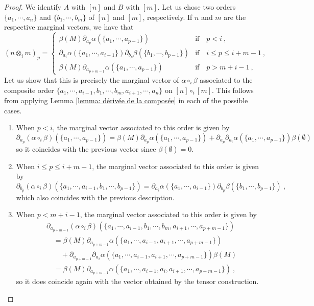 \documentclass[a4paper,12pt]{amsart}
\begin{document}
\begin{proof}
We identify $A$ with $[n]$ and $B$ with $[m]$. Let us chose two orders $\{a_1,\cdots,a_n\}$ and $\{b_1,\cdots,b_m\}$ of $[n]$ and $[m]$, respectively. If $n$ and $m$ are the respective marginal vectors, we have that
\[
(n \otimes_i m)_{p} = 
\begin{cases}
\beta(M)\partial_{a_p}\alpha(\{a_1,\cdots,a_{p-1}\}) & \text{if} \quad p<i~, \\
\partial_{a_i}\alpha(\{a_1,\cdots,a_{i-1}\})\partial_{b_p}\beta(\{b_1,\cdots,b_{p-1}\}) & \text{if} \quad i \leq p \leq i+m-1~, \\
\beta(M)\partial_{a_{p+m-1}}\alpha(\{a_1,\cdots,a_{p-1}\}) & \text{if} \quad p>m+i-1~,
\end{cases}
\]
Let us show that this is precisely the marginal vector of $\alpha \circ_i \beta$ associated to the composite order $\{a_1,\cdots, a_{i-1}, b_1, \cdots, b_m, a_{i+1}, \cdots, a_n\}$ on $[n] \circ_i [m]$. This follows from applying Lemma \ref{lemma: dérivée de la composée} in each of the possible cases.

\begin{enumerate}
    \item When $p<i$, the marginal vector associated to this order is given by 
    \[
    \partial_{a_p}(\alpha \circ_i \beta)(\{a_1,\cdots, a_{p-1}\}) = \beta(M)\partial_{a_p}\alpha(\{a_1,\cdots, a_{p-1}\}) + \partial_{a_p}\partial_{a_i}\alpha(\{a_1,\cdots, a_{p-1}\})\beta(\emptyset) 
    \]
    so it coincides with the previous vector since $\beta(\emptyset) = 0$.

    \medskip
    
    \item When $i \leq p \leq i+m-1$, the marginal vector associated to this order is given by 
    \[
    \partial_{b_p}(\alpha \circ_i \beta)(\{a_1,\cdots, a_{i-1}, b_1, \cdots, b_{p-1}\}) = \partial_{a_i}\alpha(\{a_1,\cdots, a_{i-1}\})\partial_{b_p}\beta(\{b_1, \cdots, b_{p-1}\})~,
    \]
    which also coincides with the previous description. 

    \medskip
    
    \item When $p<m+i-1$, the marginal vector associated to this order is given by 
    \[
    \begin{aligned}
        & \partial_{a_{p+m-1}}(\alpha \circ_i \beta)(\{a_1,\cdots, a_{i-1}, b_1, \cdots, b_{m},a_{i+1}, \cdots, a_{p+m-1}\})  \\ & \quad = \beta(M)\partial_{a_{p+m-1}}\alpha(\{a_1,\cdots, a_{i-1}, a_{i+1}, \cdots, a_{p+m-1}\}) \\ & \qquad + \partial_{a_{p+m-1}}\partial_{a_i}\alpha(\{a_1,\cdots, a_{i-1}, a_{i+1}, \cdots, a_{p+m-1}\})\beta(M) \\
        & \quad = \beta(M)\partial_{a_{p+m-1}}\alpha(\{a_1,\cdots, a_{i-1}, a_i, a_{i+1}, \cdots, a_{p+m-1}\})~,
    \end{aligned}
    \]
    so it does coincide again with the vector obtained by the tensor construction. 
\end{enumerate}
\end{proof}
\end{document}
